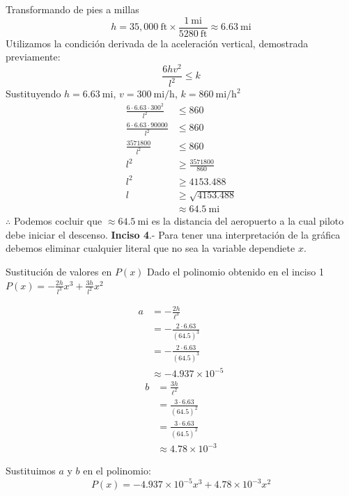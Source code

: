 Transformando de pies a millas $$h = 35,000 \ \mathrm{ft} \times \frac{1 \ \mathrm{mi}}{5280 \ \mathrm{ft}} \approx 6.63 \ \mathrm{mi}$$
Utilizamos la condición derivada de la aceleración vertical, demostrada previamente: $$\frac{6 h v^2}{l^2} \leq k$$
Sustituyendo $h = 6.63 \ \mathrm{mi}$, $v = 300 \ \mathrm{mi/h}$, $k = 860 \ \mathrm{mi/h^2}$
\begin{align*}
	\frac{6 \cdot 6.63 \cdot 300^2}{l^2} & \leq 860                   \\
	\frac{6 \cdot 6.63 \cdot 90000}{l^2} & \leq 860                   \\
	\frac{3571800}{l^2}                  & \leq 860                   \\
	l^2                                  & \geq \frac{3571800}{860}   \\
	l^2                                  & \geq 4153.488              \\
	l                                    & \geq \sqrt{4153.488}       \\
	                                     & \approx 64.5 \ \mathrm{mi}
\end{align*}
$\therefore$ Podemos cocluir que $\approx 64.5 \ \mathrm{mi}$ es la distancia del aeropuerto a la cual  piloto debe iniciar el descenso.
\newpage
\textbf{Inciso 4}.- Para tener una interpretación de la gráfica debemos eliminar cualquier literal que no sea la variable dependiete $x$.

Sustitución de valores en $P(x)$
Dado el polinomio obtenido en el inciso 1 $P(x) = -\frac{2h}{l^3}x^3 + \frac{3h}{l^2}x^2$
\begin{multicols}{2}
    \noindent
    \begin{align*}
        a & = -\frac{2h}{\ell^3}             \\
          & = -\frac{2 \cdot 6.63}{(64.5)^3} \\
          & = -\frac{2 \cdot 6.63}{(64.5)^3} \\
          & \approx -4.937 \times 10^{-5}
    \end{align*}
    \columnbreak
    \begin{align*}
        b & = \frac{3h}{\ell^2}             \\
          & = \frac{3 \cdot 6.63}{(64.5)^2} \\
          & = \frac{3 \cdot 6.63}{(64.5)^2} \\
          & \approx 4.78 \times 10^{-3}
    \end{align*}    
\end{multicols}
Sustituimos $a$ y $b$ en el polinomio: $$P(x) = -4.937 \times 10^{-5} x^3 + 4.78 \times 10^{-3} x^2$$


